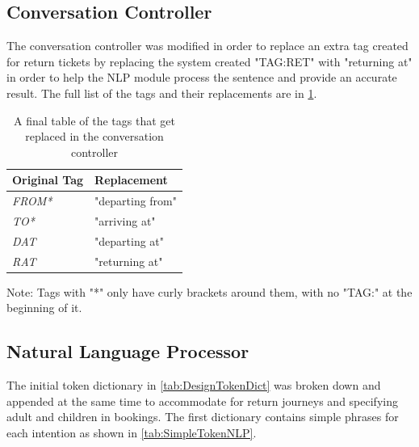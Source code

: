 \documentclass[11pt]{article}
\begin{document}
    \subsection{Conversation Controller}
    
    The conversation controller was modified in order to replace an extra tag created for return tickets by replacing the system created "{TAG:RET}" with "returning at" in order to help the NLP module process the sentence and provide an accurate result. The full list of the tags and their replacements are in \cref{tab:ConvContImpTag}.
    \begin{table}[!ht]
    \centering
\begin{tabular}{|l|l|}
\hline
\textbf{Original Tag} & \textbf{Replacement} \\ \hline
\textit{FROM*}        & "departing from"     \\ \hline
\textit{TO*}          & "arriving at"        \\ \hline
\textit{DAT}          & "departing at"       \\ \hline
\textit{RAT}          & "returning at"       \\ \hline
\end{tabular}
\label{tab:ConvContImpTag}
\caption{A final table of the tags that get replaced in the conversation controller}
Note: Tags with "*" only have curly brackets around them, with no "TAG:" at the beginning of it.
\end{table}

    \subsection{Natural Language Processor}
    The initial token dictionary in \cref{tab:DesignTokenDict} was broken down and appended at the same time to accommodate for return journeys and specifying adult and children in bookings. The first dictionary contains simple phrases for each intention as shown in \cref{tab:SimpleTokenNLP}.
    
\end{document}
